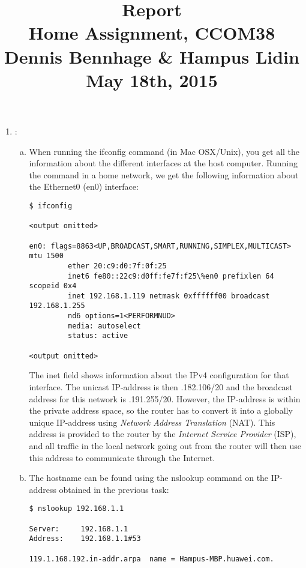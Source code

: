 \documentclass[a4paper,9pt,fleqn]{article}
\title{
{\bf Report}\\
\vspace{0.2cm}
%
Home Assignment, CCOM38\\
\vspace{1cm}
%
{\large Dennis Bennhage \& Hampus Lidin}\\
\vspace{10cm}
%
May 18th, 2015
}
\date{}
\begin{document}
\maketitle

\newpage

\begin{enumerate}[{Task} 1]
\item :
\begin{enumerate}[a)]
\item 
When running the {\outp ifconfig} command (in Mac OSX/Unix), you get all the
information about the different interfaces at the host computer. Running the
command in a home network, we get the following information
about the {\outp Ethernet0} (en0) interface:
			
\begin{lstlisting}
$ ifconfig

<output omitted>

en0: flags=8863<UP,BROADCAST,SMART,RUNNING,SIMPLEX,MULTICAST> mtu 1500
		 ether 20:c9:d0:7f:0f:25
		 inet6 fe80::22c9:d0ff:fe7f:f25\%en0 prefixlen 64 scopeid 0x4
		 inet 192.168.1.119 netmask 0xffffff00 broadcast 192.168.1.255
		 nd6 options=1<PERFORMNUD>
		 media: autoselect
		 status: active

<output omitted>
\end{lstlisting}

The {\outp inet} field shows information about the IPv4 configuration for that
interface. The unicast IP-address is then {.182.106/20} and the
broadcast address for this network is {.191.255/20}. However, the
IP-address is within the private address space, so the router has to
convert it into a globally unique IP-address using {\it Network Address
Translation} (NAT). This address is provided to the router by the {\it Internet
Service Provider} (ISP), and all traffic in the local network going out
from the router will then use this address to communicate through the
Internet.
    
\item 
The hostname can be found using the {\outp nslookup} command on the IP-address
obtained in the previous task:

\begin{lstlisting}
$ nslookup 192.168.1.1

Server:		192.168.1.1
Address:	192.168.1.1#53

119.1.168.192.in-addr.arpa	name = Hampus-MBP.huawei.com.
\end{lstlisting}


\end{enumerate}
\end{enumerate}
\end{document}
